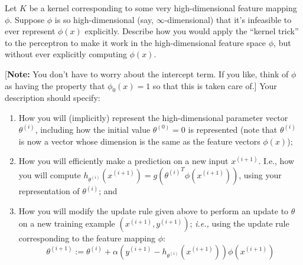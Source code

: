 \item {} Let $K$ be a kernel corresponding to some
very high-dimensional feature
mapping $\phi$. Suppose $\phi$ is so high-dimensional (say,
$\infty$-dimensional) that it's infeasible to ever represent $\phi(x)$
explicitly.  
Describe how you would apply the ``kernel trick'' to the
perceptron to make it work in the high-dimensional feature space $\phi$, but
without ever explicitly computing $\phi(x)$.

[\textbf{Note:} You don't have to worry about the intercept term.  If you like,
think of $\phi$ as having the property that $\phi_0(x) = 1$ so that this is
taken care of.] Your description should specify:
\begin{enumerate}[label=\roman*.]
  \item {} How you will (implicitly) represent the
  high-dimensional
    parameter vector $\theta^{(i)}$, including how the initial value
    $\theta^{(0)} = 0$ is represented (note that $\theta^{(i)}$ is
    now a vector whose dimension is the same as the feature vectors
    $\phi(x)$);
  \item {} How you will efficiently make a prediction on a
  new input
    $x^{(i+1)}$.  I.e., how you will compute
    $h_{\theta^{(i)}}(x^{(i+1)}) = g({\theta^{(i)}}^T \phi(x^{(i+1)}))$,
    using your representation of $\theta^{(i)}$; and
  \item {} How you will modify the update rule given above
  to perform an
  update to $\theta$ on a new training example $(x^{(i+1)}, y^{(i+1)})$;
  \emph{i.e.,} using the update rule corresponding to the feature mapping
  $\phi$:
  \begin{equation*}
  \theta^{(i+1)} :=
	  \theta^{(i)} + \alpha (y^{(i+1)} - h_{\theta^{(i)}}(x^{(i+1)})) \phi(x^{(i+1)})
  \end{equation*}
\end{enumerate}
